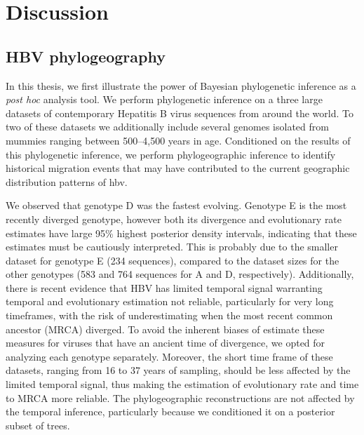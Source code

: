 \chapter{Discussion}\label{ch:discussion}

\section{HBV phylogeography}

In this thesis, we first illustrate the power of Bayesian phylogenetic inference as a \textit{post hoc} analysis tool.
We perform phylogenetic inference on a three large datasets of contemporary Hepatitis B virus sequences from around the world.
To two of these datasets we additionally include several genomes isolated from mummies ranging between 500--4,500 years in age.
Conditioned on the results of this phylogenetic inference, we perform phylogeographic inference to identify historical migration events that may have contributed to the current geographic distribution patterns of \gls{hbv}.

We observed that genotype D was the fastest evolving.
Genotype E is the most recently diverged genotype, however both its divergence and evolutionary rate estimates have large 95\% highest posterior density intervals, indicating that these estimates must be cautiously interpreted.
This is probably due to the smaller dataset for genotype E (234 sequences), compared to the dataset sizes for the other genotypes (583 and 764 sequences for A and D, respectively).
Additionally, there is recent evidence that HBV has limited temporal signal warranting temporal and evolutionary estimation not reliable, particularly for very long timeframes, with the risk of underestimating when the most recent common ancestor (MRCA) diverged\cite{ross2018paradox}.
To avoid the inherent biases of estimate these measures for viruses that have an ancient time of divergence, we opted for analyzing each genotype separately.
Moreover, the short time frame of these datasets, ranging from 16 to 37 years of sampling, should be less affected by the limited temporal signal, thus making the estimation of evolutionary rate and time to MRCA more reliable.
The phylogeographic reconstructions are not affected by the temporal inference, particularly because we conditioned it on a posterior subset of trees.

